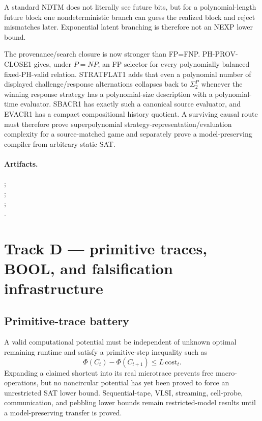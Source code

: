 \documentclass[11pt]{article}
\begin{document}
A standard NDTM does not literally see future bits, but for a polynomial-length future block one
nondeterministic branch can guess the realized block and reject mismatches later. Exponential latent
branching is therefore not an NEXP lower bound.

The provenance/search closure is now stronger than FP=FNP. PH-PROV-CLOSE1 gives, under \(P=NP\),
an FP selector for every polynomially balanced fixed-PH-valid relation. STRATFLAT1 adds that even a
polynomial number of displayed challenge/response alternations collapses back to \(\Sigma_2^P\)
whenever the winning response strategy has a polynomial-size description with a polynomial-time
evaluator. SBACR1 has exactly such a canonical source evaluator, and EVACR1 has a compact
compositional history quotient. A surviving causal route must therefore prove superpolynomial
strategy-representation/evaluation complexity for a source-matched game and separately prove a
model-preserving compiler from arbitrary static SAT.

\paragraph{Artifacts.}
;\\
;\\
;\\
.

\section{Track D --- primitive traces, BOOL, and falsification infrastructure}

\subsection{Primitive-trace battery}

A valid computational potential must be independent of unknown optimal remaining runtime and satisfy
a primitive-step inequality such as
\[
\Phi(C_t)-\Phi(C_{t+1})\le L\,\mathrm{cost}_t.
\]
Expanding a claimed shortcut into its real microtrace prevents free macro-operations, but no
noncircular potential has yet been proved to force an unrestricted SAT lower bound. Sequential-tape,
VLSI, streaming, cell-probe, communication, and pebbling lower bounds remain restricted-model
results until a model-preserving transfer is proved.
\end{document}
